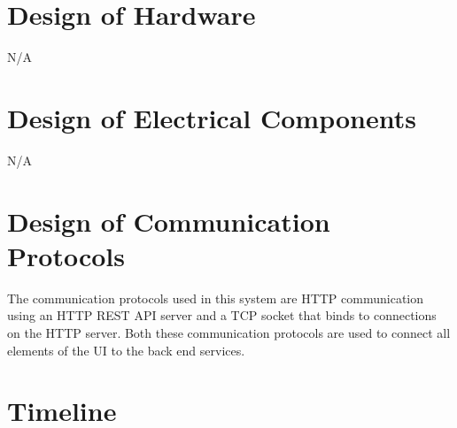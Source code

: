 \documentclass[12pt, titlepage]{article}
\begin{document}
	\section{Design of Hardware}
	
	N/A
	
	\section{Design of Electrical Components}
	
	N/A
	
	\section{Design of Communication Protocols}
	
	The communication protocols used in this system are HTTP communication using an HTTP REST API server and a TCP socket that binds to connections on the HTTP server. Both these communication protocols are used to connect all elements of the UI to the back end services.
	
	\section{Timeline}
	
\end{document}
